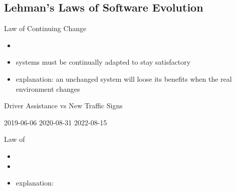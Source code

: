 \subsection{Lehman's Laws of Software Evolution}
\begin{frame}{\insertsubsection}
	\begin{fancycolumns}
		\begin{definition}{Law of Continuing Change\mysource{\lehmanslaws}}
			\begin{itemize}
				\item {}
				\item systems must be continually adapted to stay satisfactory %
				\item explanation: an unchanged system will loose its benefits when the real environment changes
			\end{itemize}
		\end{definition}
		\begin{example}{Driver Assistance vs New Traffic Signs}
			\begin{fancycolumns}[b,columns=3,animation=none]
				\centering{}
				2019-06-06
			\nextcolumn
				\centering{}
				2020-08-31
			\nextcolumn
				\centering{}
				2022-08-15
			\end{fancycolumns}
		\end{example}
		\nextcolumn
		\begin{definition}{Law of \mysource{\lehmanslaws}}
			\begin{itemize}
				\item \deutsch{}
				\item 
				\item explanation: 
			\end{itemize}
		\end{definition}
		\begin{example}{}
		\end{example}
	\end{fancycolumns}
\end{frame}

